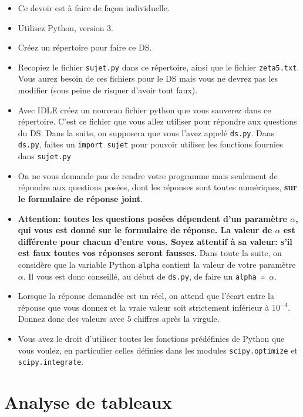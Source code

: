 \begin{itemize}
\item Ce devoir est à faire de façon individuelle.
\item Utilisez Python, version 3.
\item Créez un répertoire pour faire ce DS.
\item Recopiez le fichier
  \texttt{sujet.py} dans ce répertoire, ainsi
  que le fichier \texttt{zeta5.txt}.
  Vous aurez besoin de ces fichiers pour le DS mais vous ne devrez pas
  les modifier (sous peine de risquer d'avoir tout faux).
\item Avec IDLE créez un nouveau fichier python que vous sauverez dans
  ce répertoire. C'est ce fichier que vous allez utiliser pour répondre aux
  questions du DS. Dans la suite, on supposera que vous l'avez appelé
  \texttt{ds.py}.
  Dans \texttt{ds.py}, faites un \texttt{import sujet}
  pour pouvoir utiliser les fonctions fournies dans \texttt{sujet.py}
\item On ne vous demande pas de rendre votre programme mais seulement
  de répondre aux questions posées, dont les réponses sont toutes
  numériques, \textbf{sur le formulaire de réponse joint}.
\item \textbf{Attention: toutes les questions posées dépendent d'un
  paramètre $\alpha$, qui vous est donné sur le formulaire de réponse. La valeur de
  $\alpha$ est différente pour chacun d'entre vous. Soyez attentif à
  sa valeur: s'il est faux toutes vos réponses seront fausses.}
  Dans toute la suite, on considère que la variable Python \texttt{alpha}
  contient la valeur de votre paramètre $\alpha$. Il vous est donc
  conseillé, au début de \texttt{ds.py}, de faire un \texttt{alpha =
    $\alpha$}.
\item Lorsque la réponse demandée est un réel, on attend que l'écart
  entre la réponse que vous donnez et la vraie valeur soit strictement
  inférieur à $10^{-4}$. Donnez donc des valeurs avec $5$ chiffres après la
  virgule.
\item Vous avez le droit d'utiliser toutes les fonctions prédéfinies
  de Python que vous voulez, en particulier celles définies dans les
  modules \texttt{scipy.optimize} et \texttt{scipy.integrate}.
\end{itemize}


\section{Analyse de tableaux}

